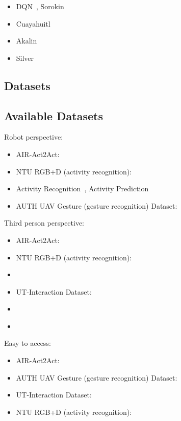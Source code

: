 \documentclass[thesis]{mas_proposal}
\begin{document}
\begin{itemize}
	\item DQN~\cite{mnih2015human}, Sorokin~\cite{sorokin2015deep}
	\item Cuayahuitl~\cite{Cuayahuitl2020}
	\item Akalin~\cite{Akalin2018}
	\item Silver~\cite{Silver2016}
\end{itemize}

\subsection{Datasets}
\subsection{Available Datasets}

Robot perspective:
\begin{itemize}
	\item AIR-Act2Act: \cite{Ko2021}
	\item NTU RGB+D (activity recognition): \cite{Liu2020,Shahroudy_2016_CVPR}
	\item Activity Recognition~\cite{ryoo2013firstperson}, Activity Prediction~\cite{ryoo2015robot}
	\item AUTH UAV Gesture (gesture recognition) Dataset:~\cite{patrona2021overview,Liu2020,Perera_2018_ECCV_Workshops}
\end{itemize}

Third person perspective:
\begin{itemize}
	\item AIR-Act2Act: \cite{Ko2021}
	\item NTU RGB+D (activity recognition): \cite{Liu2020}
	\item \cite{Hu2013}
	\item UT-Interaction Dataset: \cite{UT-Interaction-Data}
	\item \cite{Gemeren2016}
	\item \cite{Yun2012}
\end{itemize}

Easy to access:
\begin{itemize}
	\item AIR-Act2Act: \cite{Ko2021}
	\item AUTH UAV Gesture (gesture recognition) Dataset:~\cite{patrona2021overview,Liu2020,Perera_2018_ECCV_Workshops}
	\item UT-Interaction Dataset: \cite{UT-Interaction-Data}
	\item NTU RGB+D (activity recognition): \cite{Liu2020,Shahroudy_2016_CVPR}
\end{itemize}
\end{document}
